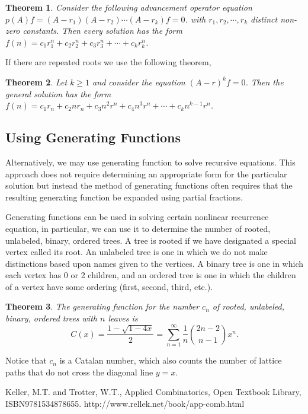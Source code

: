 \documentclass{article}
\newtheorem{theorem}{Theorem}[section]
\begin{document}
\begin{theorem}
Consider the following advancement operator equation $p(A) f = (A-r_1)(A-r_2)\cdots(A-r_k)f=0$. with $r_1 , r_2 , \cdots , r_k$ distinct non-zero constants. Then every solution has the form $f(n) = c_1 r_1^n + c_2 r_2^n + c_3 r_3^n + \cdots + c_k r_k^n$.
\end{theorem}

If there are repeated roots we use the following theorem,
\begin{theorem}
Let $k \geq 1$ and consider the equation $( A - r )^k f = 0$. Then the general solution has the form $f(n) = c_1 r_n + c_2 n r_n + c_3 n^2r^n + c_4 n^3 r^n + \cdots + c_k n^{k - 1} r ^n$.
\end{theorem}

\subsection{Using Generating Functions}
Alternatively, we may use generating function to solve recursive equations. This approach does not require determining an appropriate form for the particular solution but instead the method of generating functions often requires that the resulting generating function be expanded using partial fractions. 

Generating functions can be used in solving certain nonlinear recurrence equation, in particular, we can use it to determine the number of rooted, unlabeled, binary, ordered trees.  A tree is rooted if we have designated a special vertex called its root. An unlabeled tree is one in which we do not make distinctions based upon names given to the vertices. A binary tree is one in which each vertex has 0 or 2 children, and an ordered tree is one in which the children of a vertex have some ordering (first, second, third, etc.).

\begin{theorem}
The generating function for the number $c_n$  of rooted, unlabeled, binary, ordered trees with $n$ leaves is
\[
C(x) = \frac{1-\sqrt{1-4x}}{2} = \sum_{n=1}^\infty \frac{1}{n}\binom{2n-2}{n-1}x^n.
\]
\end{theorem}
Notice that $c_n$ is a Catalan number, which also counts the number of lattice paths that do not cross the diagonal line $y=x$.

\begin{thebibliography}{}
\bibitem{}
Keller, M.T. and Trotter, W.T., Applied Combinatorics, Open Textbook Library, ISBN9781534878655. http://www.rellek.net/book/app-comb.html

\end{thebibliography}
\end{document}
